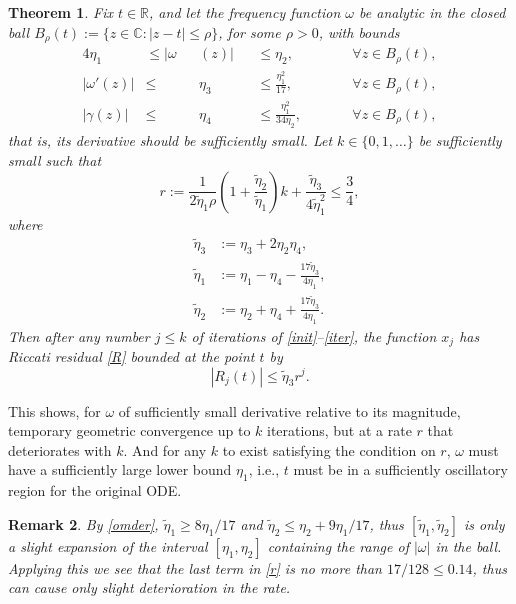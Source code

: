 \documentclass[10pt]{article}
\newcommand{\be}{\begin{equation}}
\newcommand{\ee}{\end{equation}}
\newcommand{\C}{\mathbb{C}}
\newcommand{\R}{\mathbb{R}}
\newtheorem{thm}{Theorem}
\newtheorem{rmk}[thm]{Remark}
\newcommand{\om}{\omega}
\newcommand{\g}{\gamma}
\newcommand{\te}{\tilde\eta}
\begin{document}
\begin{thm}\label{TR}
  Fix $t\in\R$, and let the frequency function $\om$ be analytic
  in the closed ball $B_\rho(t) := \{z\in\C : |z-t| \le \rho\}$,
  for some $\rho>0$, with bounds
    \begin{alignat}{4}
        \eta_1 &\leq |\om&&(z)| &&\leq \eta_2, \qquad &&\forall z\in B_\rho(t), \label{ommag} \\
        |\om'(z)| &\leq &&\eta_3 &&\leq \frac{\eta_1^2}{17}, &&\forall z\in B_\rho(t), \label{omder} \\
        |\g(z)| &\leq &&\eta_4 &&\leq \frac{\eta_1^2}{34\eta_2}, \qquad &&\forall z\in B_\rho(t), \label{gammaupper}
  \end{alignat}
  that is, its derivative should be sufficiently small.
  Let $k\in\{0,1,\dots\}$ be sufficiently small such that
  \be
    r := \frac{1}{2\te_1 \rho} \left(1 + \frac{\te_2}{\te_1}\right) k + \frac{\te_3}{4\te_1^2} \leq \frac{3}{4},
  \label{r}
  \ee
  where
  \begin{align}
    \te_3 &:= \eta_3 + 2\eta_2\eta_4, \label{eta3}
    \\
    \te_1 &:= \eta_1 - \eta_4 - \frac{17 \te_3}{4 \eta_1},  \label{eta1}
    \\ 
    \te_2 &:= \eta_2 + \eta_4 + \frac{17 \te_3}{4 \eta_1}. \label{eta2}
  \end{align}
  Then after any number $j\le k$ of iterations of \cref{init}--\cref{iter},
  the function $x_j$ has Riccati residual \cref{R} bounded at the point $t$ by
  \be
  |R_j(t)| \le \te_3 r^j.
  \label{Rjbnd}
  \ee
\end{thm}
This shows, for $\om$ of sufficiently small derivative
relative to its magnitude,
temporary geometric convergence up to $k$ iterations,
but at a rate $r$ that deteriorates with $k$.
And for any $k$ to exist satisfying the condition on $r$, $\om$ must have
a sufficiently large lower bound $\eta_1$, i.e., $t$
must be in a sufficiently oscillatory region for the original ODE.

\begin{rmk}\label{slight}
    By \cref{omder}, $\te_1 \ge 8\eta_1/17$ and $\te_2 \le \eta_2 + 9\eta_1/17$,
  thus $[\te_1,\te_2]$ is only a slight
  expansion of the interval $[\eta_1,\eta_2]$ containing the range of
    $|\om|$ in the ball.
  Applying this we see that the last term in \cref{r}
    is no more than $17/128 \leq 0.14$, thus can cause only slight deterioration in the rate.
\end{rmk}
\end{document}

